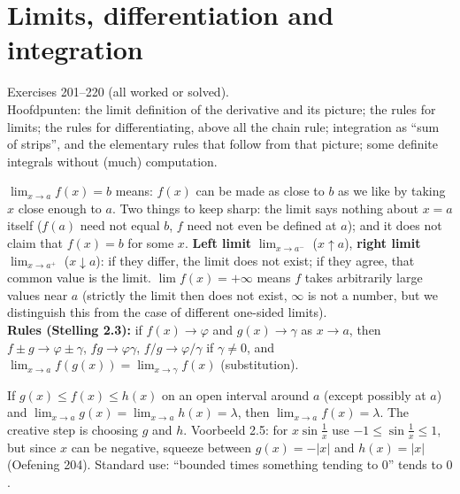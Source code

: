 \chapter{Limits, differentiation and integration}
%
{Exercises 201--220 (all worked or solved).\\ Hoofdpunten: the limit definition of the derivative and its picture; the rules for limits; the rules for differentiating, above all the chain rule; integration as ``sum of strips'', and the elementary rules that follow from that picture; some definite integrals without (much) computation.}


\begin{key}
$\lim_{x\to a}f(x)=b$ means: $f(x)$ can be made as close to $b$ as we like by taking $x$ close enough to $a$. Two things to keep sharp: the limit says nothing about $x=a$ itself ($f(a)$ need not equal $b$, $f$ need not even be defined at $a$); and it does not claim that $f(x)=b$ for some $x$. \textbf{Left limit} $\lim_{x\to a^-}$ ($x\uparrow a$), \textbf{right limit} $\lim_{x\to a^+}$ ($x\downarrow a$): if they differ, the limit does not exist; if they agree, that common value is the limit. $\lim f(x)=+\infty$ means $f$ takes arbitrarily large values near $a$ (strictly the limit then does not exist, $\infty$ is not a number, but we distinguish this from the case of different one-sided limits).\\
\textbf{Rules (Stelling 2.3):} if $f(x)\to\varphi$ and $g(x)\to\gamma$ as $x\to a$, then $f\pm g\to\varphi\pm\gamma$, $fg\to\varphi\gamma$, $f/g\to\varphi/\gamma$ if $\gamma\ne0$, and $\lim_{x\to a}f(g(x))=\lim_{x\to\gamma}f(x)$ (substitution).
\end{key}
\begin{result}
If $g(x)\le f(x)\le h(x)$ on an open interval around $a$ (except possibly at $a$) and $\lim_{x\to a}g(x)=\lim_{x\to a}h(x)=\lambda$, then $\lim_{x\to a}f(x)=\lambda$. The creative step is choosing $g$ and $h$. Voorbeeld 2.5: for $x\sin\frac1x$ use $-1\le\sin\frac1x\le1$, but since $x$ can be negative, squeeze between $g(x)=-|x|$ and $h(x)=|x|$ (Oefening 204). Standard use: ``bounded times something tending to $0$'' tends to $0$.
\end{result}

